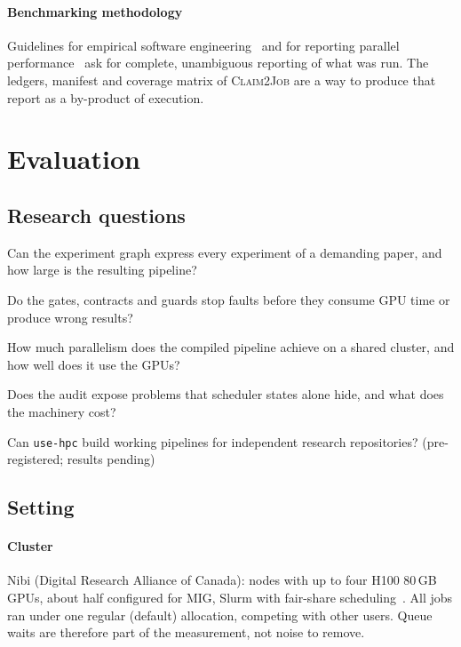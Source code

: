 \documentclass[pdflatex,sn-mathphys-num]{sn-jnl}
\theoremstyle{thmstyleone}%
\theoremstyle{thmstyletwo}%
\theoremstyle{thmstylethree}%
\newcommand{\cj}{\textsc{Claim2Job}}
\newcommand{\skill}{\texttt{use-hpc}}
\newcommand{\RQ}[1]{\textbf{RQ#1}}
\begin{document}
\paragraph{Benchmarking methodology} Guidelines for empirical software
engineering~\cite{wohlin2012experimentation} and for reporting parallel
performance~\cite{hoefler2015scientific} ask for complete, unambiguous
reporting of what was run. The ledgers, manifest and coverage matrix of \cj{}
are a way to produce that report as a by-product of execution.

\section{Evaluation}\label{sec:eval}

\subsection{Research questions}\label{sec:rqs}

\begin{description}[leftmargin=1.1em, style=nextline, itemsep=2pt]
\item[\RQ{1} (Expressiveness and coverage)] Can the experiment graph express
every experiment of a demanding paper, and how large is the resulting
pipeline?
\item[\RQ{2} (Safety)] Do the gates, contracts and guards stop faults before
they consume GPU time or produce wrong results?
\item[\RQ{3} (Efficiency)] How much parallelism does the compiled pipeline
achieve on a shared cluster, and how well does it use the GPUs?
\item[\RQ{4} (Observability and overhead)] Does the audit expose problems that
scheduler states alone hide, and what does the machinery cost?
\item[\RQ{5} (Generality)] Can \skill{} build working pipelines for
independent research repositories? (pre-registered; results pending)
\end{description}

\subsection{Setting}\label{sec:setting}

\paragraph{Cluster} Nibi (Digital Research Alliance of Canada): nodes with up to four H100 80\,GB GPUs, about half configured for MIG, Slurm with
fair-share scheduling~\cite{alliance2026docs}. All jobs ran under one regular
(default) allocation, competing with other users. Queue waits are therefore
part of the measurement, not noise to remove.
\end{document}
